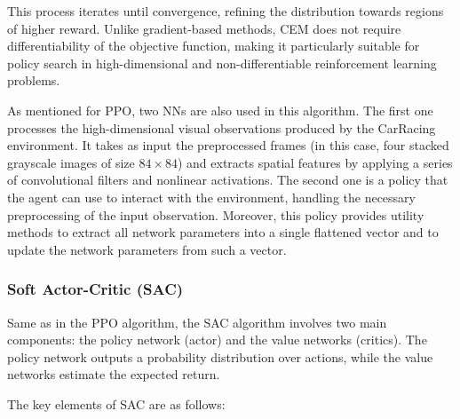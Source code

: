 \documentclass[../CSC_52081_EP.tex]{subfiles}
\begin{document}
This process iterates until convergence, refining the distribution towards regions of higher reward. Unlike gradient-based methods, CEM does not require differentiability of the objective function, making it particularly suitable for policy search in high-dimensional and non-differentiable reinforcement learning problems.

As mentioned for PPO, two NNs are also used in this algorithm. The first one processes the high-dimensional visual observations produced by the CarRacing environment. It takes as input the preprocessed frames (in this case, four stacked grayscale images of size \(84 \times 84\)) and extracts spatial features by applying a series of convolutional filters and nonlinear activations. The second one is a policy that the agent can use to interact with the environment, handling the necessary preprocessing of the input observation. Moreover, this policy provides utility methods to extract all network parameters into a single flattened vector and to update the network parameters from such a vector.

\hspace{1cm}
\subsubsection{Soft Actor-Critic (SAC)}
Same as in the PPO algorithm, the SAC algorithm involves two main components: the policy network (actor) and the value networks (critics). The policy network outputs a probability distribution over actions, while the value networks estimate the expected return.

The key elements of SAC are as follows:
\end{document}
